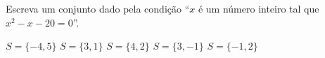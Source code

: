 \noindent\parbox{\linewidth}{

Escreva um conjunto dado pela condição ``$x$ é um número inteiro tal que $x^2-x-20=0$''.

$S=\{-4,5\}$
$S=\{3,1\}$
$S=\{4,2\}$
$S=\{3,-1\}$
$S=\{-1,2\}$



}


